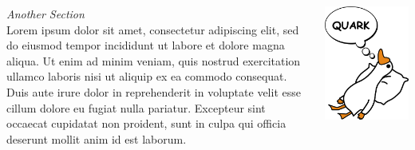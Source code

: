 \documentclass[22pt,margin=0.5in,innermargin=-4.5in,blockverticalspace=-0.5in]{tikzposter}
\begin{document}
\begin{columns}
{\textit{Another Section}\\
Lorem ipsum dolor sit amet, consectetur adipiscing elit, sed do eiusmod tempor incididunt ut labore et dolore magna aliqua. Ut enim ad minim veniam, quis nostrud exercitation ullamco laboris nisi ut aliquip ex ea commodo consequat. Duis aute irure dolor in reprehenderit in voluptate velit esse cillum dolore eu fugiat nulla pariatur. Excepteur sint occaecat cupidatat non proident, sunt in culpa qui officia deserunt mollit anim id est laborum. \\ 
\begin{center}
    \includegraphics{Figures/DreamingDuck.png}
\end{center}
 
}

\end{columns}
\end{document}
